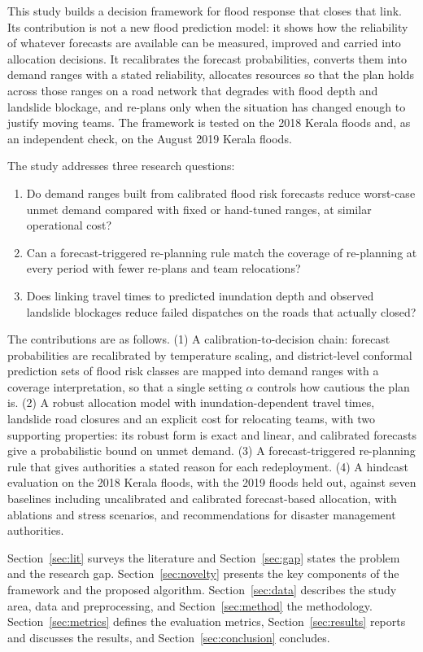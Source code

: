 \documentclass[pdflatex,sn-basic]{sn-jnl}
\theoremstyle{plain}%
\theoremstyle{remark}%
\theoremstyle{definition}%
\begin{document}
This study builds a decision framework for flood response that closes that link. Its contribution is not a new flood prediction model: it shows how the reliability of whatever forecasts are available can be measured, improved and carried into allocation decisions. It recalibrates the forecast probabilities, converts them into demand ranges with a stated reliability, allocates resources so that the plan holds across those ranges on a road network that degrades with flood depth and landslide blockage, and re-plans only when the situation has changed enough to justify moving teams. The framework is tested on the 2018 Kerala floods and, as an independent check, on the August 2019 Kerala floods.

The study addresses three research questions:
\begin{enumerate}
\item[RQ1.] Do demand ranges built from calibrated flood risk forecasts reduce worst-case unmet demand compared with fixed or hand-tuned ranges, at similar operational cost?
\item[RQ2.] Can a forecast-triggered re-planning rule match the coverage of re-planning at every period with fewer re-plans and team relocations?
\item[RQ3.] Does linking travel times to predicted inundation depth and observed landslide blockages reduce failed dispatches on the roads that actually closed?
\end{enumerate}

The contributions are as follows. (1) A calibration-to-decision chain: forecast probabilities are recalibrated by temperature scaling, and district-level conformal prediction sets of flood risk classes are mapped into demand ranges with a coverage interpretation, so that a single setting $\alpha$ controls how cautious the plan is. (2) A robust allocation model with inundation-dependent travel times, landslide road closures and an explicit cost for relocating teams, with two supporting properties: its robust form is exact and linear, and calibrated forecasts give a probabilistic bound on unmet demand. (3) A forecast-triggered re-planning rule that gives authorities a stated reason for each redeployment. (4) A hindcast evaluation on the 2018 Kerala floods, with the 2019 floods held out, against seven baselines including uncalibrated and calibrated forecast-based allocation, with ablations and stress scenarios, and recommendations for disaster management authorities.

Section~\ref{sec:lit} surveys the literature and Section~\ref{sec:gap} states the problem and the research gap. Section~\ref{sec:novelty} presents the key components of the framework and the proposed algorithm. Section~\ref{sec:data} describes the study area, data and preprocessing, and Section~\ref{sec:method} the methodology. Section~\ref{sec:metrics} defines the evaluation metrics, Section~\ref{sec:results} reports and discusses the results, and Section~\ref{sec:conclusion} concludes.
\end{document}
